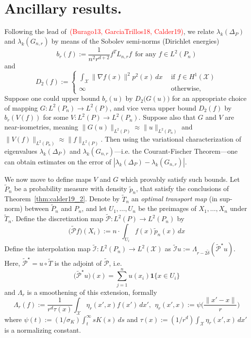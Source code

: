 \documentclass{article}
\newcommand{\1}{\mathbf{1}}
\newcommand{\Lap}{L}
\newcommand{\Xset}{\mathcal{X}}
\newcommand{\Leb}{L}
\newcommand{\mc}[1]{\mathcal{#1}}
\newcommand{\wt}[1]{\widetilde{#1}}
\theoremstyle{alden}
\theoremstyle{aldenthm}
\theoremstyle{definition}
\theoremstyle{remark}
\begin{document}
\section{Ancillary results.}
Following the lead of~\textcolor{red}{(Burago13, GarciaTrillos18, Calder19)}, we relate $\lambda_k(\Delta_P)$ and $\lambda_k(G_{n,r})$ by means of the Sobolev semi-norms (Dirichlet energies)
\begin{equation*}
b_r(f) := \frac{1}{n^2 r^{d+ 2}}f^T \Lap_{n,r} f~~\textrm{for any $f \in \Leb^2(P_n)$}
\end{equation*}
and
\begin{equation*}
D_2(f) :=
\begin{cases*}
\int_{\Xset} \|\nabla f(x)\|^2 p^2(x) \,dx~~ &\textrm{if $f \in H^1(\Xset)$} \\
\infty~~ & \textrm{otherwise,}
\end{cases*}
\end{equation*}
Suppose one could upper bound $b_r(u)$ by $D_2\bigl(G(u)\bigr)$ for an appropriate choice of mapping $G: \Leb^2(P_n) \to \Leb^2(P)$, and vice versa upper bound $D_2(f)$ by $b_r(V(f))$ for some $V: \Leb^2(P) \to \Leb^2(P_n)$. Suppose also that $G$ and $V$ are near-isometries, meaning $\|G(u)\|_{\Leb^2(P)} \approx \|u\|_{\Leb^2(P_n)}$ and $\|V(f)\|_{\Leb^2(P_n)} \approx \|f\|_{\Leb^2(P)}$. Then using the variational characterization of eigenvalues $\lambda_k(\Delta_P)$ and $\lambda_k(G_{n,r})$---i.e. the Courant-Fischer Theorem---one can obtain estimates on the error of $|\lambda_k(\Delta_P) - \lambda_k(G_{n,r})|$.

We now move to define maps $V$ and $G$ which provably satisfy such bounds. Let $\wt{P}_n$ be a probability measure with density $\wt{p}_n$, that satisfy the conclusions of Theorem~\ref{thm:calder19_2}. Denote by $\wt{T}_n$ an \emph{optimal transport map} (in sup-norm) between $\wt{P}_n$ and $P_n$, and let $U_1,\ldots,U_n$ be the preimages of $X_1,\ldots,X_n$ under $\wt{T}_n$. Define the discretization map  $\wt{\mathcal{P}}: \Leb^2(P) \to \Leb^2(P_n)$ by
\begin{equation*}
\bigl(\wt{\mathcal{P}}f\bigr)(X_i) := n \cdot \int_{U_i} f(x) \wt{p}_n(x) \,dx
\end{equation*}
Define the interpolation map $\wt{\mc{I}}: \Leb^2(P_n) \to \Leb^2(\Xset)$ as $\wt{\mc{I}}u := \Lambda_{r - 2\wt{\delta}}(\wt{\mc{P}}^{\star}u)$. Here, $\wt{\mc{P}}^{\star} = u \circ \wt{T}$ is the adjoint of $\wt{\mc{P}}$, i.e.
\begin{equation*}
\bigl(\wt{\mc{P}}^{\star}u\bigr)(x) = \sum_{j = 1}^{n} u(x_i) \1\{x \in U_i\} 
\end{equation*} 
and $\Lambda_r$ is a smoothening of this extension, formally
\begin{equation*}
\Lambda_r(f) := \frac{1}{r^d\tau(x)}\int_{\Xset} \eta_r(x',x) f(x') \,dx',~~ \eta_r(x',x) := \psi\biggl(\frac{\|x' - x\|}{r}\biggr)
\end{equation*}
where $\psi(t) := (1/\sigma_K)\int_{t}^{\infty} s K(s) \,ds$ and $\tau(x) := (1/r^d)\int_{\Xset} \eta_r(x',x) \,dx'$ is a normalizing constant.
\end{document}
